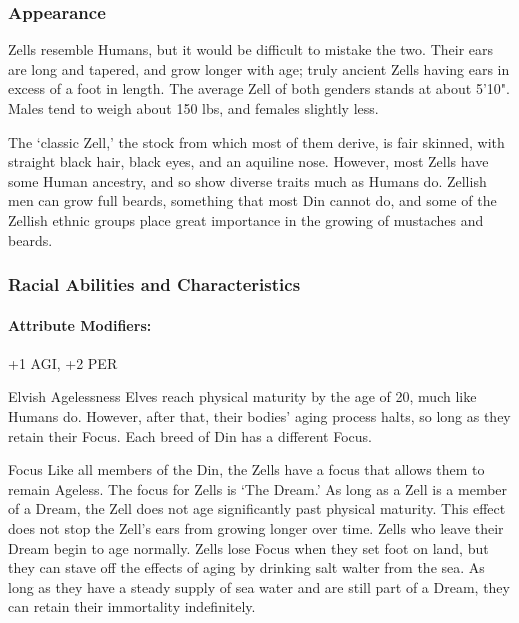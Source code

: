 \documentclass[oneside,11pt,english]{book}
\begin{document}
 

\subsubsection*{Appearance} 
Zells resemble Humans, but it would be difficult to mistake the two. Their ears are long and tapered, and 
grow longer with age; truly ancient Zells having ears in excess of a foot in length. 
The average Zell of both genders stands at about 5'10". Males tend to weigh about 150 lbs, and females 
slightly less. 

 


The ‘classic Zell,’ the stock from which most of them derive, is fair skinned, with straight black hair, 
black eyes, and an aquiline nose. However, most Zells have some Human ancestry, and so show diverse 
traits much as Humans do. Zellish men can grow full beards, something that most Din cannot do, and 
some of the Zellish ethnic groups place great importance in the growing of mustaches and beards. 

 

\subsubsection*{Racial Abilities and Characteristics} 
\paragraph{Attribute Modifiers:} +1 AGI, +2 PER 

 

Elvish Agelessness 
Elves reach physical maturity by the age of 20, much like Humans do. However, after that, their 
bodies' aging process halts, so long as they retain their Focus. Each breed of Din has a different 
Focus. 

 

Focus 
Like all members of the Din, the Zells have a focus that allows them to remain Ageless. The 
focus for Zells is ‘The Dream.’ As long as a Zell is a member of a Dream, the Zell does not age 
significantly past physical maturity. This effect does not stop the Zell's ears from growing longer 
over time. Zells who leave their Dream begin to age normally. 
Zells lose Focus when they set foot on land, but they can stave off the effects of aging by drinking 
salt walter from the sea. As long as they have a steady supply of sea water and are still part of a 
Dream, they can retain their immortality indefinitely. 

 
\end{document}
